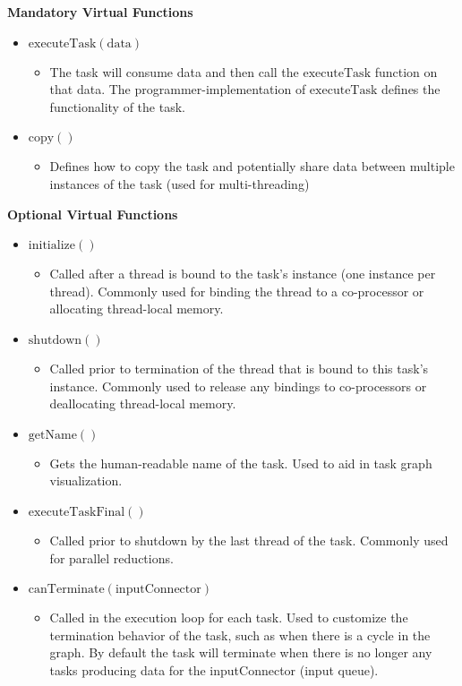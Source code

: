 \documentclass[]{article}
\begin{document}
\begin{description}
	\textbf{Mandatory Virtual Functions}
	\begin{itemize}
	\item $\mathrm{executeTask(data)}$
		\begin{itemize}
		\item The task will consume data and then call the $\mathrm{executeTask}$ function on that data. The programmer-implementation of $\mathrm{executeTask}$ defines the functionality of the task.
		\end{itemize}
	\item $\mathrm{copy()}$
		\begin{itemize}
		\item Defines how to copy the task and potentially share data between multiple instances of the task (used for multi-threading)
		\end{itemize}
	\end{itemize}

	\textbf{Optional Virtual Functions}
	\begin{itemize}
	\item $\mathrm{initialize()}$
		\begin{itemize}
		\item Called after a thread is bound to the task's instance (one instance per thread). Commonly used for binding the thread to a co-processor or allocating thread-local memory.
		\end{itemize}
	\item $\mathrm{shutdown()}$
		\begin{itemize}
		\item Called prior to termination of the thread that is bound to this task's instance. Commonly used to release any bindings to co-processors or deallocating thread-local memory.
		\end{itemize}	
	\item $\mathrm{getName()}$
		\begin{itemize}
		\item Gets the human-readable name of the task. Used to aid in task graph visualization.
		\end{itemize}		
	\item $\mathrm{executeTaskFinal()}$
		\begin{itemize}
		\item Called prior to shutdown by the last thread of the task. Commonly used for parallel reductions.
		\end{itemize}		
	\item $\mathrm{canTerminate(inputConnector)}$
		\begin{itemize}
		\item Called in the execution loop for each task. Used to customize the termination behavior of the task, such as when there is a cycle in the graph. By default the task will terminate when there is no longer any tasks producing data for the inputConnector (input queue).
		\end{itemize}		
	\end{itemize}


\end{description}
\end{document}
